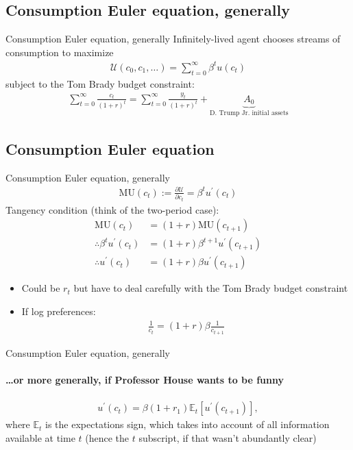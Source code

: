 \documentclass[presentation,dvipsnames]{beamer}
\begin{document}
\subsection{Consumption Euler equation, generally}
\begin{frame}[label=sec-2-2]{Consumption Euler equation, generally}
Infinitely-lived agent chooses streams of consumption to maximize
\begin{align*}
\mathcal{U}(c_{0},c_{1},\dots) = \sum\limits_{t=0}^{\infty} \beta^{t} u(c_{t})
\end{align*}
subject to the Tom Brady budget constraint:
\begin{align*}
\sum\limits_{t=0}^{\infty} \frac{c_{t}}{(1+r)^{t}} = \sum\limits_{t=0}^{\infty} \frac{y_{t}}{(1+r)^{t}} +
\underbrace{A_{0}}_{\text{D.~Trump Jr.~initial assets}}
\end{align*}
\end{frame}

\subsection{Consumption Euler equation}
\begin{frame}[label=sec-2-2]{Consumption Euler equation, generally}
\begin{align*}
\text{MU}(c_{t}) := \frac{\partial \mathcal{U}}{\partial c_{t}} = \beta^{t} u^{\prime}(c_{t})
\end{align*}
Tangency condition (think of the two-period case):
\begin{align*}
\text{MU}(c_{t}) &= (1+r) \text{MU}(c_{t+1}) \\
\therefore \beta^{t} u^{\prime}(c_{t}) &= (1+r) \beta^{t+1}u^{\prime}(c_{t+1}) \\
\therefore u^{\prime}(c_{t}) &= (1+r) \beta u^{\prime}(c_{t+1})
\end{align*}
\begin{itemize}[label={--}]
\item Could be $r_{t}$ but have to deal carefully with the Tom Brady budget constraint
\item If log preferences:
\begin{align*}
\frac{1}{c_{t}} = (1+r)\beta \frac{1}{c_{t+1}}
\end{align*}
\end{itemize}
\end{frame}

\begin{frame}[label=sec-2-2]{Consumption Euler equation, generally}
\framesubtitle{\dots or more generally, if Professor House wants to be funny}
\begin{align*}
u^{\prime}(c_{t}) = \beta (1+r_{1}) \mathbb{E}_{t} \left[ u^{\prime}(c_{t+1}) \right],
\end{align*}
where $\mathbb{E}_{t}$ is the expectations sign,
which takes into account of all information available at time $t$
(hence the $t$ subscript, if that wasn't abundantly clear)
\end{frame}
\end{document}
